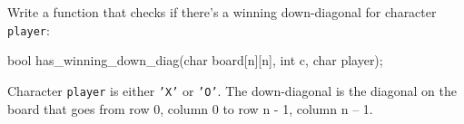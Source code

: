 \begin{ex}
  Write a function that checks if there's a winning down-diagonal for character \texttt{player}:

\begin{consolethree}
bool has_winning_down_diag(char board[n][n], int c, char player); 
\end{consolethree}

Character \texttt{player} is either \texttt{'X'} or \texttt{'O'}. The down-diagonal is the diagonal on the board that goes from row 0, column 0 to row n - 1, column n -- 1.
\end{ex}

